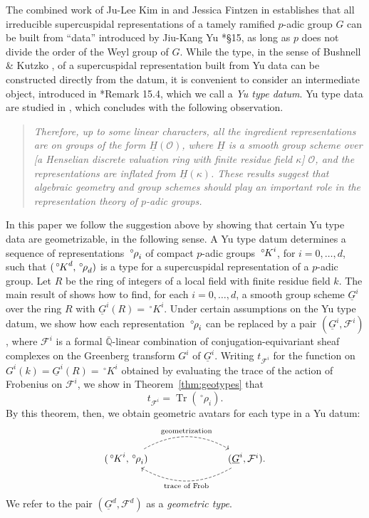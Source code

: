 \documentclass[10pt]{amsart}
\theoremstyle{plain}
\theoremstyle{definition}
\newcommand{\QQ}{{\mathbb{Q}}}
\DeclareMathOperator{\trace}{Tr}
\newcommand{\trFrob}[1]{t_{#1}}
\newcommand{\cs}[1]{{\mathcal{#1}}}
\newcommand{\oK}{{\,^\circ \hskip-1pt K}}
\newcommand{\orho}{{\,^\circ \hskip-1pt \rho}}
\begin{document}
The combined work of Ju-Lee Kim in \cite{kim:07a} and Jessica Fintzen in \cites{fintzen:18a,fintzen:19a} establishes that all irreducible supercuspidal representations of a tamely ramified $p$-adic group $G$ can be built from ``data'' introduced by Jiu-Kang Yu \cite{yu:01a}*{\S 15}, as long as $p$ does not divide the order of the Weyl group of $G$.
While the type, in the sense of Bushnell \& Kutzko \cite{bushnell-kutzko:98a}, of a supercuspidal representation built from Yu data can be constructed directly from the datum, it is convenient to consider an intermediate object, introduced in \cite{yu:01a}*{Remark 15.4}, which we call a \emph{Yu type datum}. 
Yu type data are studied in \cite{Yu:models}, which concludes with the following observation.
\begin{quotation}
{\it Therefore, up to some linear characters, all the ingredient representations 
 are on groups of the form $\underline{H}(\mathcal{O})$, where $\underline{H}$ is a smooth group scheme over [a Henselian discrete valuation ring with finite residue field $\kappa$] $\mathcal{O}$, and the representations are inflated from $\underline{H}(\kappa)$. These results suggest that algebraic geometry and group schemes should play an
important role in the representation theory of $p$-adic groups.}
\end{quotation}

In this paper we follow the suggestion above by showing that certain Yu type data are geometrizable, in the following sense.
A Yu type datum determines a sequence of representations $\orho_i$ of compact $p$-adic groups $\oK^i$, for $i=0, \ldots, d$, such that $(\oK^d, \orho_d)$ is a type for a supercuspidal representation of a $p$-adic group.
Let $R$ be the ring of integers of a local field with finite residue field $k$.
The main result of \cite{Yu:models} shows how to find, for each $i=0, \ldots, d$, a smooth group scheme $\underline{G}^i$ over the ring $R$ with $\underline{G}^i(R)=\,^\circ K^i $.
Under certain assumptions on the Yu type datum, we show how each representation $\orho_i$ can be replaced by a pair $(\underline{G}^i, \cs{F}^i)$, where $\cs{F}^i$ is a formal ${\bar\QQ}$-linear combination of conjugation-equivariant sheaf complexes on the Greenberg transform $G^i$ of $\underline{G}^i$.
%
Writing $\trFrob{\cs{F}^i}$ for the function on $G^i(k) = \underline{G}^i(R) = \,^\circ K^i$ obtained by evaluating the trace of the action of Frobenius on $\cs{F}^i$, we show in Theorem~\ref{thm:geotypes} that 
\begin{equation}\label{eqn:intro1}
\trFrob{\cs{F}^i} = \trace(\,^\circ\rho_i).
\end{equation}
By this theorem, then, we obtain geometric avatars for each type in a Yu datum:
\[
\begin{tikzcd}
(\oK^i,\orho_i) \arrow[bend left, dashed]{rrr}{\text{geometrization}} &&& \arrow[bend left, dashed]{lll}{\text{trace of Frob}}
(\underline{G}^i, \cs{F}^i).
\end{tikzcd}
\]
We refer to the pair $(\underline{G}^d, \cs{F}^d)$ as a \emph{geometric type}.
\end{document}
